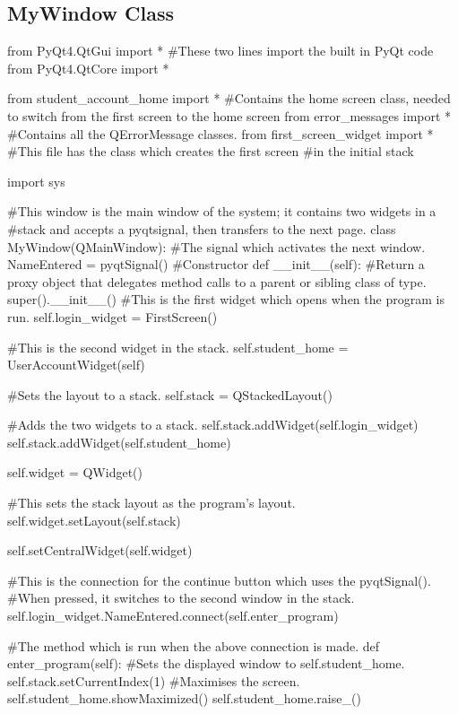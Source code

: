 \begin{landscape}

\subsection{MyWindow Class}

\begin{python}
from PyQt4.QtGui import * #These two lines import the built in PyQt code
from PyQt4.QtCore import *

from student_account_home import * #Contains the home screen class, needed to switch from the first screen to the home screen
from error_messages import * #Contains all the QErrorMessage classes.
from first_screen_widget import * #This file has the class which creates the first screen
                                  #in the initial stack

import sys

#This window is the main window of the system; it contains two widgets in a
#stack and accepts a pyqtsignal, then transfers to the next page.
class MyWindow(QMainWindow):
    #The signal which activates the next window.
    NameEntered = pyqtSignal()
    #Constructor
    def __init__(self):
        #Return a proxy object that delegates method calls to a parent or sibling class of type.
        super().__init__()
        #This is the first widget which opens when the program is run.
        self.login_widget = FirstScreen()
        
        #This is the second widget in the stack.      
        self.student_home = UserAccountWidget(self)
        
        #Sets the layout to a stack.
        self.stack = QStackedLayout()
        
        #Adds the two widgets to a stack.
        self.stack.addWidget(self.login_widget)
        self.stack.addWidget(self.student_home)
       
        self.widget = QWidget()
        
        #This sets the stack layout as the program's layout.
        self.widget.setLayout(self.stack)
        
        self.setCentralWidget(self.widget)

        #This is the connection for the continue button which uses the pyqtSignal().
        #When pressed, it switches to the second window in the stack.
        self.login_widget.NameEntered.connect(self.enter_program)
        
    #The method which is run when the above connection is made.
    def enter_program(self):
        #Sets the displayed window to self.student_home.
        self.stack.setCurrentIndex(1)
        #Maximises the screen.
        self.student_home.showMaximized()
        self.student_home.raise_()
        

\end{python}
\end{landscape}
